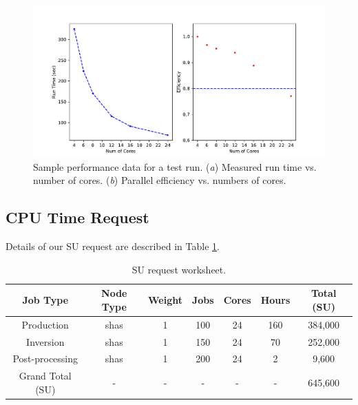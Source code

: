 \documentclass[10pt, letterpaper]{article}
\begin{document}
\begin{figure}
\centering
\includegraphics[width=\textwidth, keepaspectratio=true]{scaling.pdf}
\caption{\label{fig:scaling} Sample performance data for a test run. (\textit{a}) Measured run time vs. number of cores.  (\textit{b}) Parallel efficiency vs. numbers of cores.}
\end{figure}

\subsection{CPU Time Request}\label{sec:request}

Details of our SU request are described in Table \ref{tab:worksheet}.

\begin{table}
\centering
\begin{tabular}{| c | c | c | c | c | c | c|}
\hline
 Job Type           & Node Type & Weight & Jobs  & Cores  & Hours & Total (SU)  \\\hline
Production          & shas      & 1      & 100   & 24     & 160   & 384,000 \\
Inversion           & shas      & 1      & 150   & 24     & 70    & 252,000 \\
Post-processing     & shas      & 1      & 200   & 24     & 2     & 9,600 \\\hline
Grand Total (SU)    & -         & -      &-      & -      &-      & 645,600 \\\hline
\end{tabular}
\caption{\label{tab:worksheet}SU request worksheet.}
\end{table}
\end{document}
